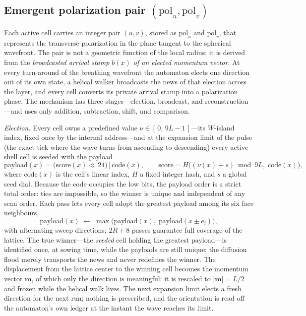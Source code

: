 \documentclass{ijuc}
\begin{document}
\subsection{Emergent polarization pair $(\mathrm{pol}_u,\mathrm{pol}_v)$}\label{subsec:polarization-pair}
Each active cell carries an integer pair $(u,v)$, stored as $\mathrm{pol}_u$ and $\mathrm{pol}_v$, that represents the transverse polarization in the plane tangent to the spherical wavefront.  The pair is not a geometric function of the local radius; it is derived from the \emph{broadcasted arrival stamp $b(x)$ of an elected momentum vector}.  At every turn-around of the breathing wavefront the automaton elects one direction out of its own state, a helical walker broadcasts the news of that election across the layer, and every cell converts its private arrival stamp into a polarization phase.  The mechanism has three stages---election, broadcast, and reconstruction---and uses only addition, subtraction, shift, and comparison.

\emph{Election.}  Every cell owns a predefined value $\nu\in[\,0,\,9L-1\,]$---its $W$-island index, fixed once by the internal address---and at the expansion limit of the pulse (the exact tick where the wave turns from ascending to descending) every active shell cell is seeded with the payload
\[
\mathrm{payload}(x)=\bigl(\mathrm{score}(x)\ll 24\bigr)\,\big|\,\mathrm{code}(x),
\qquad
\mathrm{score}=H\bigl((\nu(x)+s)\bmod 9L,\;\mathrm{code}(x)\bigr),
\]
where $\mathrm{code}(x)$ is the cell's linear index, $H$ a fixed integer hash, and $s$ a global seed dial.  Because the code occupies the low bits, the payload order is a strict total order: ties are impossible, so the winner is unique and independent of any scan order.  Each pass lets every cell adopt the greatest payload among its six face neighbours,
\[
\mathrm{payload}(x)\;\leftarrow\;\max\bigl(\mathrm{payload}(x),\;\mathrm{payload}(x\pm e_i)\bigr),
\]
with alternating sweep directions; $2R+8$ passes guarantee full coverage of the lattice.  The true winner---the \emph{seeded} cell holding the greatest payload---is identified once, at sowing time, while the payloads are still unique; the diffusion flood merely transports the news and never redefines the winner.  The displacement from the lattice center to the winning cell becomes the momentum vector $\boldsymbol{m}$, of which only the direction is meaningful: it is rescaled to $|\boldsymbol{m}|=L/2$ and frozen while the helical walk lives.  The next expansion limit elects a fresh direction for the next run; nothing is prescribed, and the orientation is read off the automaton's own ledger at the instant the wave reaches its limit.
\end{document}

